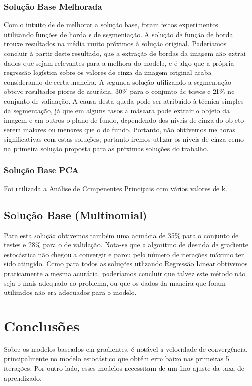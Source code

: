 \documentclass[conference]{IEEEtran}
\begin{document}
\subsubsection{Solução Base Melhorada}
Com o intuito de de melhorar a solução base, foram feitos experimentos utilizando funções de borda e de segmentação. A solução de função de borda trouxe resultados na média muito próximos à solução original. Poderíamos concluir à partir deste resultado, que a extração de bordas da imagem não extrai dados que sejam relevantes para a melhora do modelo, e é algo que a própria regressão logística sobre os valores de cinza da imagem original acaba considerando de certa maneira. A segunda solução utilizando a segmentação obteve resultados piores de acurácia. 30\% para o conjunto de testes e 21\% no conjunto de validação. A causa desta queda pode ser atribuído à técnica simples da segmentação, já que em alguns casos a máscara pode extrair o objeto da imagem e em outros o plano de fundo, dependendo dos níveis de cinza do objeto serem maiores ou menores que o do fundo. Portanto, não obtivemos melhoras significativas com estas soluções, portanto iremos utlizar os níveis de cinza como na primeira solução proposta para as próximas soluções do trabalho.

\subsubsection{Solução Base PCA}
Foi utilizada a Análise de Compenentes Principais com vários valores de k.

\subsection{Solução Base (Multinomial)}
Para esta solução obtivemos também uma acurácia de 35\% para o conjunto de testes e 28\% para o de validação. Nota-se que o algoritmo de descida de gradiente estocástica não chegou a convergir e parou pelo número de iterações máximo ter sido atingido. Como para todos as soluções utlizando Regressão Linear obtivemos praticamente a mesma acurácia, poderíamos concluir que talvez este método não seja o mais adequado ao problema, ou que os dados da maneira que foram utilizados não era adequados para o modelo.


\section{Conclusões}
Sobre os modelos baseados em gradientes, é notável a velocidade de convergência, principalmente no modelo estocástico que obtém erro baixo nas primeiras 5 iterações. Por outro lado, esses modelos necessitam de um fino ajuste da taxa de aprendizado.
\end{document}
